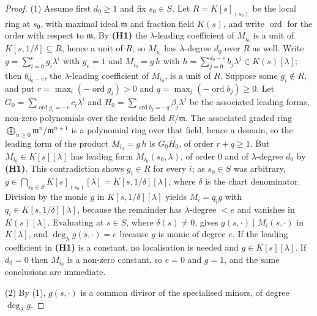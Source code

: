 \documentclass[journal]{IEEEtran}
\theoremstyle{plainn}
\theoremstyle{remark}
\begin{document}
\begin{proof}
(1) Assume first $d_0\ge1$ and fix $s_0\in S$. Let $R=K[s]_{(s_0)}$ be the local ring at $s_0$, with maximal
ideal $\mathfrak m$ and fraction field $K(s)$, and write $\operatorname{ord}$ for the order with respect to
$\mathfrak m$. By \textbf{(H1)} the $\lambda$-leading coefficient of $M_{i_0}$ is a unit of
$K[s,1/\delta]\subseteq R$, hence a unit of $R$, so
$M_{i_0}$ has $\lambda$-degree $d_0$ over $R$ as well. Write $g=\sum_{i=0}^{e}g_i\lambda^i$ with $g_e=1$
and $M_{i_0}=g\,h$ with $h=\sum_{j=0}^{d_0-e}b_j\lambda^j\in K(s)[\lambda]$; then $b_{d_0-e}$, the
$\lambda$-leading coefficient of $M_{i_0}$, is a unit of $R$. Suppose some $g_i\notin R$, and put
$r=\max_i(-\operatorname{ord}g_i)>0$ and $q=\max_j(-\operatorname{ord}b_j)\ge0$. Let
$G_0=\sum_{\operatorname{ord}g_i=-r}c_i\lambda^i$ and
$H_0=\sum_{\operatorname{ord}b_j=-q}\beta_j\lambda^j$ be the associated leading forms, non-zero polynomials
over the residue field $R/\mathfrak m$. The associated graded ring
$\bigoplus_{n\ge0}\mathfrak m^n/\mathfrak m^{n+1}$ is a polynomial ring over that field, hence a domain, so
the leading form of the product $M_{i_0}=g\,h$ is $G_0H_0$, of order $r+q\ge1$. But
$M_{i_0}\in K[s][\lambda]$ has leading form $M_{i_0}(s_0,\lambda)$, of order $0$ and of $\lambda$-degree
$d_0$ by \textbf{(H1)}. This contradiction shows $g_i\in R$ for every $i$; as $s_0\in S$ was
arbitrary, $g\in\bigcap_{s_0\in S}K[s]_{(s_0)}[\lambda]=K[s,1/\delta][\lambda]$, where $\delta$ is the
chart denominator. Division by the monic $g$ in $K[s,1/\delta][\lambda]$ yields
$M_i=q_ig$ with $q_i\in K[s,1/\delta][\lambda]$, because the remainder has $\lambda$-degree $<e$ and
vanishes in $K(s)[\lambda]$. Evaluating at $s\in S$, where $\delta(s)\neq0$, gives
$g(s,\cdot)\mid M_i(s,\cdot)$ in $K[\lambda]$, and $\deg_\lambda g(s,\cdot)=e$ because $g$ is monic of
degree $e$. If the leading coefficient in \textbf{(H1)} is a constant, no localisation is needed and
$g\in K[s][\lambda]$. If $d_0=0$ then $M_{i_0}$
is a non-zero constant, so $e=0$ and $g=1$, and the same conclusions are immediate.

(2) By (1), $g(s,\cdot)$ is a common divisor of the specialised minors, of degree $\deg_\lambda g$.


\end{proof}
\end{document}
